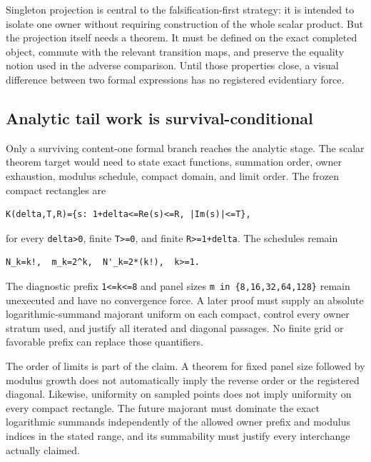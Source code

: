 \documentclass[11pt]{article}
\begin{document}
Singleton projection is central to the falsification-first strategy: it
is intended to isolate one owner without requiring construction of the
whole scalar product. But the projection itself needs a theorem. It
must be defined on the exact completed object, commute with the relevant
transition maps, and preserve the equality notion used in the adverse
comparison. Until those properties close, a visual difference between
two formal expressions has no registered evidentiary force.

\hypertarget{46-analytic-tail-work-is-survival-conditional}{%
\subsection{Analytic tail work is
survival-conditional}\label{46-analytic-tail-work-is-survival-conditional}}

Only a surviving content-one formal branch reaches the analytic stage.
The scalar theorem target would need to state exact functions, summation
order, owner exhaustion, modulus schedule, compact domain, and limit
order. The frozen compact rectangles are

\begin{verbatim}
K(delta,T,R)={s: 1+delta<=Re(s)<=R, |Im(s)|<=T},
\end{verbatim}

for every \texttt{delta\textgreater{}0}, finite
\texttt{T\textgreater{}=0}, and finite \texttt{R\textgreater{}=1+delta}.
The schedules remain

\begin{verbatim}
N_k=k!,  m_k=2^k,  N'_k=2*(k!),  k>=1.
\end{verbatim}

The diagnostic prefix \texttt{1\textless{}=k\textless{}=8} and panel
sizes \texttt{m\ in\ \{8,16,32,64,128\}} remain unexecuted and have no
convergence force. A later proof must supply an absolute
logarithmic-summand majorant uniform on each compact, control every
owner stratum used, and justify all iterated and diagonal passages. No
finite grid or favorable prefix can replace those quantifiers.

The order of limits is part of the claim. A theorem for fixed panel size
followed by modulus growth does not automatically imply the reverse
order or the registered diagonal. Likewise, uniformity on sampled
points does not imply uniformity on every compact rectangle. The future
majorant must dominate the exact logarithmic summands independently of
the allowed owner prefix and modulus indices in the stated range, and
its summability must justify every interchange actually claimed.
\end{document}
